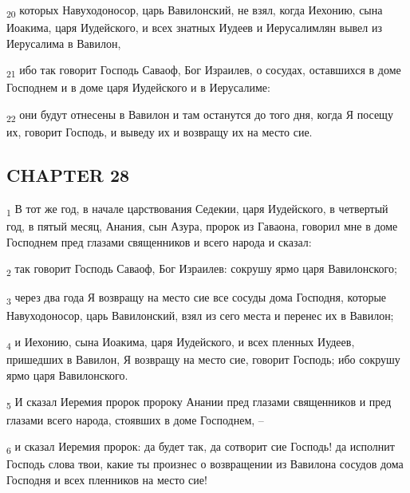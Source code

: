 \begin{tcolorbox}
\textsubscript{20} которых Навуходоносор, царь Вавилонский, не взял, когда Иехонию, сына Иоакима, царя Иудейского, и всех знатных Иудеев и Иерусалимлян вывел из Иерусалима в Вавилон,
\end{tcolorbox}
\begin{tcolorbox}
\textsubscript{21} ибо так говорит Господь Саваоф, Бог Израилев, о сосудах, оставшихся в доме Господнем и в доме царя Иудейского и в Иерусалиме:
\end{tcolorbox}
\begin{tcolorbox}
\textsubscript{22} они будут отнесены в Вавилон и там останутся до того дня, когда Я посещу их, говорит Господь, и выведу их и возвращу их на место сие.
\end{tcolorbox}
\subsection{CHAPTER 28}
\begin{tcolorbox}
\textsubscript{1} В тот же год, в начале царствования Седекии, царя Иудейского, в четвертый год, в пятый месяц, Анания, сын Азура, пророк из Гаваона, говорил мне в доме Господнем пред глазами священников и всего народа и сказал:
\end{tcolorbox}
\begin{tcolorbox}
\textsubscript{2} так говорит Господь Саваоф, Бог Израилев: сокрушу ярмо царя Вавилонского;
\end{tcolorbox}
\begin{tcolorbox}
\textsubscript{3} через два года Я возвращу на место сие все сосуды дома Господня, которые Навуходоносор, царь Вавилонский, взял из сего места и перенес их в Вавилон;
\end{tcolorbox}
\begin{tcolorbox}
\textsubscript{4} и Иехонию, сына Иоакима, царя Иудейского, и всех пленных Иудеев, пришедших в Вавилон, Я возвращу на место сие, говорит Господь; ибо сокрушу ярмо царя Вавилонского.
\end{tcolorbox}
\begin{tcolorbox}
\textsubscript{5} И сказал Иеремия пророк пророку Анании пред глазами священников и пред глазами всего народа, стоявших в доме Господнем, --
\end{tcolorbox}
\begin{tcolorbox}
\textsubscript{6} и сказал Иеремия пророк: да будет так, да сотворит сие Господь! да исполнит Господь слова твои, какие ты произнес о возвращении из Вавилона сосудов дома Господня и всех пленников на место сие!
\end{tcolorbox}
